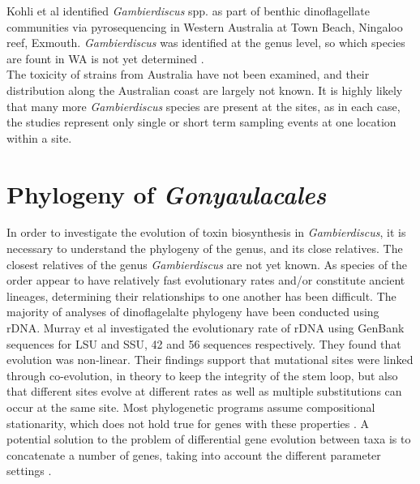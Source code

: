 \documentclass[12pt]{article}
\begin{document}
Kohli et al identified \emph{Gambierdiscus} spp. as part of benthic dinoflagellate communities via pyrosequencing in Western Australia at Town Beach, Ningaloo reef, Exmouth.  \emph{Gambierdiscus} was identified at the genus level, so which species are fount in WA is not yet determined \cite{kohli2014cob}. \\

 The toxicity of strains from Australia have not been examined, and their distribution along the Australian coast are largely not known. It is highly likely that many more \emph{Gambierdiscus} species are present at the sites, as in each case, the studies represent only single or short term sampling events at one location within a site.


\section{Phylogeny of \emph{Gonyaulacales}}
In order to investigate the evolution of toxin biosynthesis in \textit{Gambierdiscus}, it is necessary to understand the phylogeny of the genus, and its close relatives. The closest relatives of the genus \textit{Gambierdiscus} are not yet known.  As species of the order appear to have relatively fast evolutionary rates and/or constitute ancient lineages, determining their relationships to one another has been difficult. The majority of analyses of dinoflagelalte phylogeny have been conducted using rDNA. Murray et al investigated the evolutionary rate of rDNA using GenBank sequences for LSU and SSU, 42 and 56 sequences respectively. They found that evolution was non-linear. Their findings support that mutational sites were linked through co-evolution, in theory to keep the integrity of the stem loop, but also that different sites evolve at different rates as well as multiple substitutions can occur at the same site. Most phylogenetic programs assume compositional stationarity, which does not hold true for genes with these properties \cite{murray2005improving}. A potential solution to the problem of differential gene evolution between taxa is to concatenate a number of genes, taking into account the different parameter settings \cite{gontcharov2004combined,pupko2002combining}.\\
\end{document}
